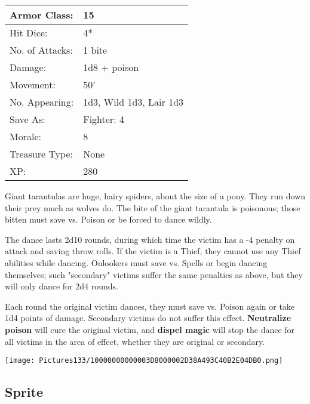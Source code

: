 \documentclass[a4paper,twoside,openany,10pt]{book}
\begin{document}
\begin{multicols}{2}
\begin{tabularx}{0.50\textwidth}{@{}lX@{}}
Armor Class: & 15 \\\hline
Hit Dice: & 4* \\\hline
No. of Attacks: & 1 bite \\\hline
Damage: & 1d8 + poison \\\hline
Movement: & 50' \\\hline
No. Appearing: & 1d3, Wild 1d3, Lair 1d3 \\\hline
Save As: & Fighter: 4 \\\hline
Morale: & 8 \\\hline
Treasure Type: & None \\\hline
XP: & 280 \\\hline
\end{tabularx}\medskip

Giant tarantulas are huge, hairy spiders, about the size of a pony. They run down their prey much as wolves do. The bite of the giant tarantula is poisonous; those bitten must save vs. Poison or be forced to dance wildly. 

The dance lasts 2d10 rounds, during which time the victim has a -4 penalty on attack and saving throw rolls. If the victim is a Thief, they cannot use any Thief abilities while dancing. Onlookers must save vs. Spells or begin dancing themselves; such "secondary" victims suffer the same penalties as above, but they will only dance for 2d4 rounds.

Each round the original victim dances, they must save vs. Poison again or take 1d4 points of damage. Secondary victims do not suffer this effect. \textbf{Neutralize poison} will cure the original victim, and \textbf{dispel magic} will stop the dance for all victims in the area of effect, whether they are original or secondary.

\vfill

\begin{center} \texttt{[image: Pictures133/10000000000003D8000002D38A493C40B2E04DB0.png]} \end{center}

\columnbreak

\subsection*{Sprite}\label{sprite}


\end{multicols}
\end{document}
